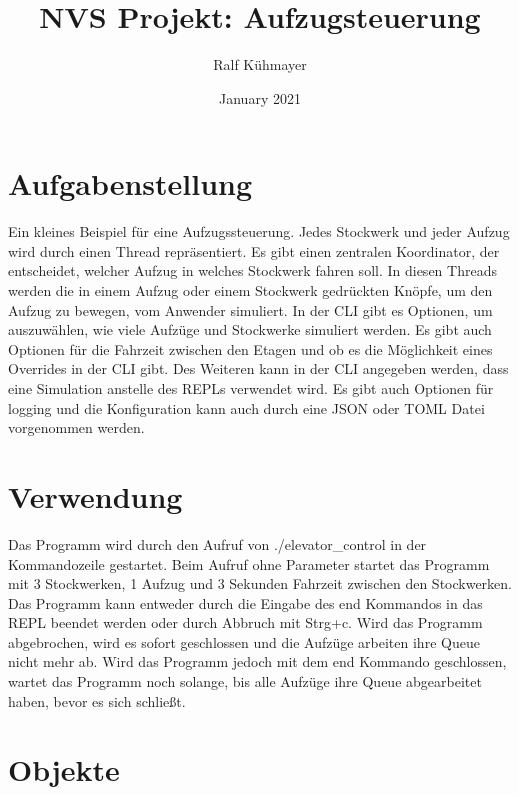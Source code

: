 \documentclass[a4paper,12pt,titlepage]{scrartcl}
\title{NVS Projekt: Aufzugsteuerung}
\author{Ralf Kühmayer}
\date{January 2021}
\begin{document}
\maketitle

\newpage

\tableofcontents

\newpage

\section{Aufgabenstellung}

Ein kleines Beispiel für eine Aufzugssteuerung. Jedes Stockwerk und jeder Aufzug wird durch einen Thread repräsentiert. Es gibt einen zentralen Koordinator, der entscheidet, welcher Aufzug in welches Stockwerk fahren soll. In diesen Threads werden die in einem Aufzug oder einem Stockwerk gedrückten Knöpfe, um den Aufzug zu bewegen, vom Anwender simuliert. In der CLI gibt es Optionen, um auszuwählen, wie viele Aufzüge und Stockwerke simuliert werden. Es gibt auch Optionen für die Fahrzeit zwischen den Etagen und ob es die Möglichkeit eines Overrides in der CLI gibt. Des Weiteren kann in der CLI angegeben werden, dass eine Simulation anstelle des REPLs verwendet wird. Es gibt auch Optionen für logging und die Konfiguration kann auch durch eine JSON oder TOML Datei vorgenommen werden.


\section{Verwendung}
Das Programm wird durch den Aufruf von ./elevator\_control in der Kommandozeile gestartet. Beim Aufruf ohne Parameter startet das Programm mit 3 Stockwerken, 1 Aufzug und 3 Sekunden Fahrzeit zwischen den Stockwerken. Das Programm kann entweder durch die Eingabe des end Kommandos in das REPL beendet werden oder durch Abbruch mit Strg+c. Wird das Programm abgebrochen, wird es sofort geschlossen und die Aufzüge arbeiten ihre Queue nicht mehr ab. Wird das Programm jedoch mit dem end Kommando geschlossen, wartet das Programm noch solange, bis alle Aufzüge ihre Queue abgearbeitet haben, bevor es sich schließt.



\break

\section{Objekte}


\end{document}
